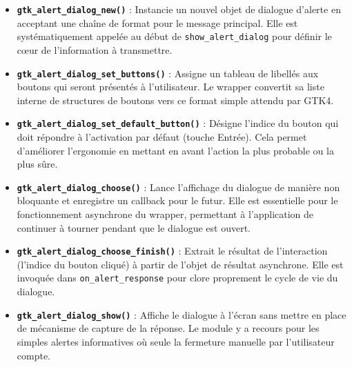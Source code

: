 \begin{itemize}
    \item \textbf{\texttt{gtk\_alert\_dialog\_new()}} : Instancie un nouvel objet de dialogue d'alerte en acceptant une chaîne de format pour le message principal. Elle est systématiquement appelée au début de \texttt{show\_alert\_dialog} pour définir le cœur de l'information à transmettre.
    \item \textbf{\texttt{gtk\_alert\_dialog\_set\_buttons()}} : Assigne un tableau de libellés aux boutons qui seront présentés à l'utilisateur. Le wrapper convertit sa liste interne de structures de boutons vers ce format simple attendu par GTK4.
    \item \textbf{\texttt{gtk\_alert\_dialog\_set\_default\_button()}} : Désigne l'indice du bouton qui doit répondre à l'activation par défaut (touche Entrée). Cela permet d'améliorer l'ergonomie en mettant en avant l'action la plus probable ou la plus sûre.
    \item \textbf{\texttt{gtk\_alert\_dialog\_choose()}} : Lance l'affichage du dialogue de manière non bloquante et enregistre un callback pour le futur. Elle est essentielle pour le fonctionnement asynchrone du wrapper, permettant à l'application de continuer à tourner pendant que le dialogue est ouvert.
    \item \textbf{\texttt{gtk\_alert\_dialog\_choose\_finish()}} : Extrait le résultat de l'interaction (l'indice du bouton cliqué) à partir de l'objet de résultat asynchrone. Elle est invoquée dans \texttt{on\_alert\_response} pour clore proprement le cycle de vie du dialogue.
    \item \textbf{\texttt{gtk\_alert\_dialog\_show()}} : Affiche le dialogue à l'écran sans mettre en place de mécanisme de capture de la réponse. Le module y a recours pour les simples alertes informatives où seule la fermeture manuelle par l'utilisateur compte.
\end{itemize}

\newpage
